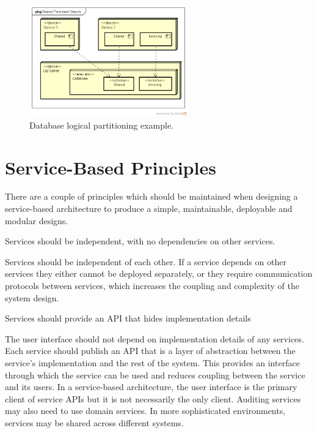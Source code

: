 \begin{figure}[h!]
    \centering
    \includegraphics[trim=37 37 20 44,clip,width=0.61\textwidth]{diagrams/db-logical-partitioning.png}
    \caption{Database logical partitioning example.}
    \label{fig:db-logical-partitioning}
\end{figure}

\section{Service-Based Principles}
There are a couple of principles which should be maintained when designing a service-based architecture
to produce a simple, maintainable, deployable and modular designs.

\vspace{1mm}
\begin{definition}\label{independent-service}
    Services should be independent, with no dependencies on other services.
\end{definition}

Services should be independent of each other.
If a service depends on other services they either cannot be deployed separately,
or they require communication protocols between services, which increases the coupling and complexity of the system design.

\vspace{1mm}
\begin{definition}\label{api-abstraction}
    Services should provide an API that hides implementation details
\end{definition}

The user interface should not depend on implementation details of any services.
Each service should publish an API that is a layer of abstraction between the service's implementation and the rest of the system.
This provides an interface through which the service can be used and reduces coupling between the service and its users.
In a service-based architecture, the user interface is the primary client of service APIs but it is not necessarily the only client.
Auditing services may also need to use domain services.
In more sophisticated environments, services may be shared across different systems.


